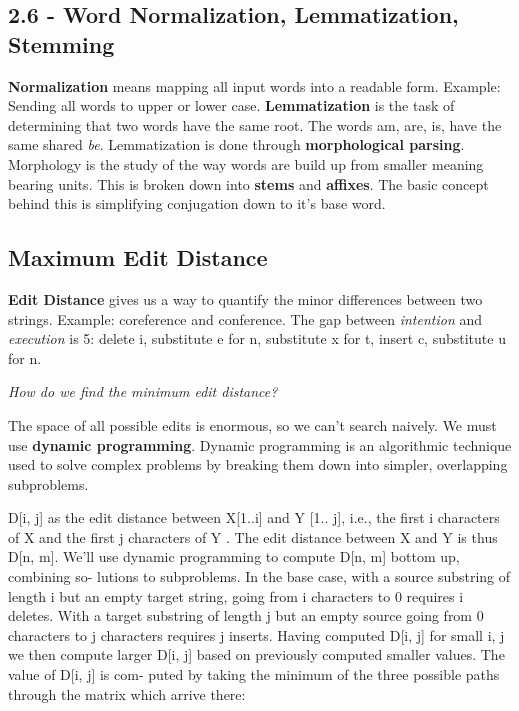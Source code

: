 \documentclass{article}
\begin{document}
\subsection{2.6 - Word Normalization, Lemmatization, Stemming }

\textbf{Normalization} means mapping all input words into a readable form. Example: Sending all words to upper or lower case.
\textbf{Lemmatization} is the task of determining that two words have the same root. The words am, are, is, have the same shared \textit{be}.
Lemmatization is done through \textbf{morphological parsing}. Morphology is the study of the way words are build up from
smaller meaning bearing units. This is broken down into \textbf{stems} and \textbf{affixes}. The basic
concept behind this is simplifying conjugation down to it's base word.

\subsection{Maximum Edit Distance}

\textbf{Edit Distance} gives us a way to quantify the minor differences between two strings. Example: coreference and conference.
The gap between \textit{intention} and \textit{execution} is 5: delete i, substitute e for n, substitute x for t, insert c, substitute u for n. \newline

\textit{How do we find the minimum edit distance?} \newline

The space of all possible edits is enormous, so we can’t search naively. We must use \textbf{dynamic programming}. Dynamic programming is an algorithmic technique used to solve complex problems by breaking them down into simpler, overlapping subproblems.

D[i, j] as the edit distance between X[1..i] and Y [1.. j], i.e., the first i characters of X
and the first j characters of Y . The edit distance between X and Y is thus D[n, m].
We’ll use dynamic programming to compute D[n, m] bottom up, combining so-
lutions to subproblems. In the base case, with a source substring of length i but an
empty target string, going from i characters to 0 requires i deletes. With a target
substring of length j but an empty source going from 0 characters to j characters
requires j inserts. Having computed D[i, j] for small i, j we then compute larger
D[i, j] based on previously computed smaller values. The value of D[i, j] is com-
puted by taking the minimum of the three possible paths through the matrix which
arrive there:
\end{document}
